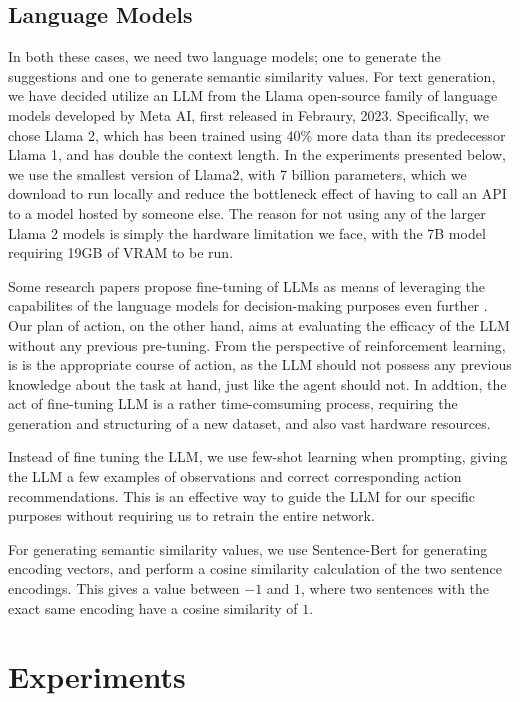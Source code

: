 \documentclass[conference]{IEEEtran}
\begin{document}
\subsection{Language Models}

In both these cases, we need two language models; one to generate the suggestions and one to generate semantic similarity values. For text generation, we have decided utilize an LLM from the Llama open-source family of language models developed by Meta AI, first released in Febraury, 2023. Specifically, we chose Llama 2, which has been trained using 40\% more data than its predecessor Llama 1, and has double the context length\cite{llama}. In the experiments presented below, we use the smallest version of Llama2, with 7 billion parameters, which we download to run locally and reduce the bottleneck effect of having to call an API to a model hosted by someone else. The reason for not using any of the larger Llama 2 models is simply the hardware limitation we face, with the 7B model requiring 19GB of VRAM to be run. 

Some research papers propose fine-tuning of LLMs as means of leveraging the capabilites of the language models for decision-making purposes even further \cite{grounding}. Our plan of action, on the other hand, aims at evaluating the efficacy of the LLM without any previous pre-tuning. From the perspective of reinforcement learning, is is the appropriate course of action, as the LLM should not possess any previous knowledge about the task at hand, just like the agent should not. In addtion, the act of fine-tuning LLM is a rather time-comsuming process, requiring the generation and structuring of a new dataset, and also vast hardware resources. 

Instead of fine tuning the LLM, we use few-shot learning when prompting, giving the LLM a few examples of observations and correct corresponding action recommendations. This is an effective way to guide the LLM for our specific purposes without requiring us to retrain the entire network.

For generating semantic similarity values, we use Sentence-Bert \cite{bert} for generating encoding vectors, and perform a cosine similarity calculation of the two sentence encodings. This gives a value between $-1$ and $1$, where two sentences with the exact same encoding have a cosine similarity of $1$.


\section{Experiments}
\end{document}
